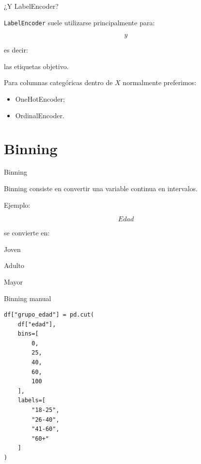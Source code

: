 \documentclass[aspectratio=169,11pt]{beamer}
\begin{document}

\begin{frame}{¿Y LabelEncoder?}

\texttt{LabelEncoder} suele utilizarse principalmente para:

\[
y
\]

es decir:

\begin{center}

las etiquetas objetivo.
\end{center}

\vspace{0.4cm}

Para columnas categóricas dentro de $X$ normalmente preferimos:

\begin{itemize}

    \item OneHotEncoder;

    \item OrdinalEncoder.

\end{itemize}

\end{frame}

\section{Binning}

\begin{frame}{Binning}

Binning consiste en convertir una variable continua en intervalos.

Ejemplo:

\[
Edad
\]

se convierte en:

\begin{center}

Joven

Adulto

Mayor
\end{center}

\end{frame}


\begin{frame}[fragile]{Binning manual}

\begin{lstlisting}
df["grupo_edad"] = pd.cut(
    df["edad"],
    bins=[
        0,
        25,
        40,
        60,
        100
    ],
    labels=[
        "18-25",
        "26-40",
        "41-60",
        "60+"
    ]
)
\end{lstlisting}

\end{frame}
\end{document}
